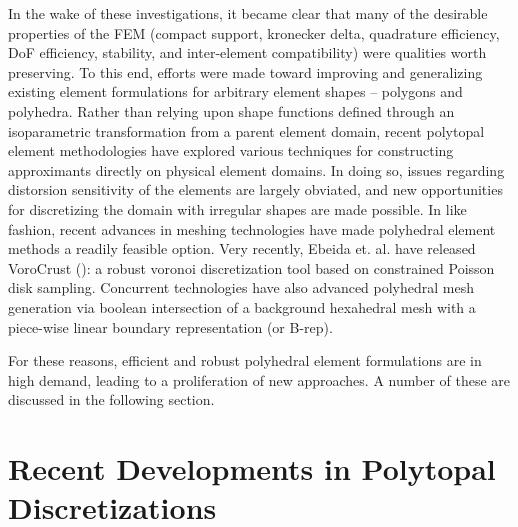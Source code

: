	In the wake of these investigations, it became clear that many of the desirable properties of the FEM (compact support, kronecker delta, quadrature efficiency, DoF efficiency, stability, and inter-element compatibility) were qualities worth preserving. To this end, efforts were made toward improving and generalizing existing element formulations for arbitrary element shapes -- polygons and polyhedra. Rather than relying upon shape functions defined through an isoparametric transformation from a parent element domain, recent polytopal element methodologies have explored various techniques for constructing approximants directly on physical element domains. In doing so, issues regarding distorsion sensitivity of the elements are largely obviated, and new opportunities for discretizing the domain with irregular shapes are made possible.
	In like fashion, recent advances in meshing technologies have made polyhedral element methods a readily feasible option. Very recently, Ebeida et. al. have released VoroCrust (\cite{Ebeida:17}): a robust voronoi discretization tool based on constrained Poisson disk sampling. Concurrent technologies have also advanced polyhedral mesh generation via boolean intersection of a background hexahedral mesh with a piece-wise linear boundary representation (or B-rep).

	For these reasons, efficient and robust polyhedral element formulations are in high demand, leading to a proliferation of new approaches. A number of these are discussed in the following section.

\section{Recent Developments in Polytopal Discretizations} %

